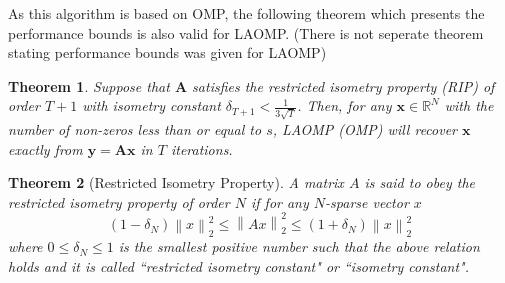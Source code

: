 \documentclass[12pt]{article}
\newtheorem{theorem}{Theorem}
\newcommand{\norm}[1]{\left\lVert #1 \right\rVert}
\begin{document}
As this algorithm is based on OMP, the following theorem which presents the performance bounds is also valid for LAOMP. (There is not seperate theorem stating performance bounds was given for LAOMP)
\newpage
\begin{theorem}
	Suppose that $\boldsymbol{A}$ satisfies the restricted isometry property (RIP) of order $T+1$ with isometry constant $\delta_{T+1} < \frac{1}{3\sqrt{T}}$. Then, for any $\boldsymbol{x} \in \mathbb{R}^N$ with the number of non-zeros less than or equal to $s$, LAOMP (OMP) will recover $\boldsymbol{x}$ exactly from $\boldsymbol{y} = \boldsymbol{A} \boldsymbol{x}$ in $T$ iterations.
\end{theorem}

\begin{theorem}[Restricted Isometry Property]
A matrix $A$ is said to obey the restricted isometry property of order $N$ if for any $N$-sparse vector $x$ 
$$(1 - \delta_N) \norm{x}^2_2 \leq \norm{Ax}_2^2 \leq (1 + \delta_N) \norm{x}_2^2$$
where $0 \leq \delta_N \leq 1$ is the smallest positive number such that the above relation holds and it is called ``restricted isometry constant" or ``isometry constant".
\end{theorem}
\end{document}
